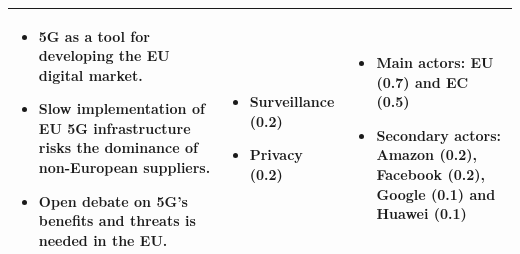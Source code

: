 \documentclass{beamer}
\begin{document}
\begin{frame}
{{\begin{block}
\begin{tabular}{|>{\centering\arraybackslash}p{}|>{\centering\arraybackslash}p{}|>{\centering\arraybackslash}p{}|}
                \begin{itemize}\item 5G as a tool for developing the EU digital market. \item Slow implementation of EU 5G infrastructure risks the dominance of non-European suppliers. \item Open debate on 5G's benefits and threats is needed in the EU. \end{itemize}& \begin{itemize} \item \textbf{Surveillance} (0.2) \item \textbf{Privacy} (0.2) \end{itemize} & \begin{itemize} \item \textbf{Main actors}: EU (0.7) and EC (0.5) \item \textbf{Secondary actors}: Amazon (0.2), Facebook (0.2), Google (0.1) and Huawei (0.1) \end{itemize} \\
                \hline
            \end{tabular}
         \end{block} 
      }
   }
\end{frame}
\end{document}
